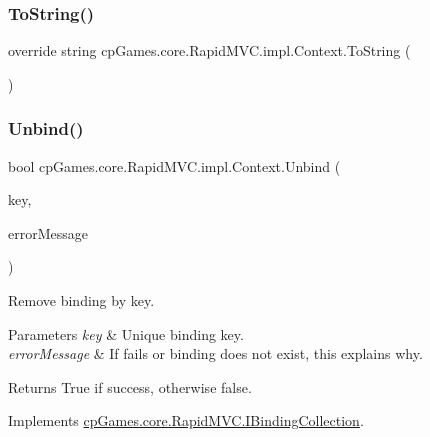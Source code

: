 \subsubsection{\texorpdfstring{ToString()}{ToString()}}
{\footnotesize\ttfamily override string cp\+Games.\+core.\+Rapid\+M\+V\+C.\+impl.\+Context.\+To\+String (\begin{DoxyParamCaption}{ }\end{DoxyParamCaption})}

\mbox{\label{classcp_games_1_1core_1_1_rapid_m_v_c_1_1impl_1_1_context_a7cf9cfaa3957b4e48fdaccd726cbd8aa}} 
\subsubsection{\texorpdfstring{Unbind()}{Unbind()}}
{\footnotesize\ttfamily bool cp\+Games.\+core.\+Rapid\+M\+V\+C.\+impl.\+Context.\+Unbind (\begin{DoxyParamCaption}\item[{\mbox{\hyperlink{interfacecp_games_1_1core_1_1_rapid_m_v_c_1_1_i_binding_key}{I\+Binding\+Key}}}]{key,  }\item[{out string}]{error\+Message }\end{DoxyParamCaption})}



Remove binding by key. 


\begin{DoxyParams}{Parameters}
{\em key} & Unique binding key.\\
\hline
{\em error\+Message} & If fails or binding does not exist, this explains why.\\
\hline
\end{DoxyParams}
\begin{DoxyReturn}{Returns}
True if success, otherwise false.
\end{DoxyReturn}


Implements \mbox{\hyperlink{interfacecp_games_1_1core_1_1_rapid_m_v_c_1_1_i_binding_collection_ab20c12c64a91e24e7685780dd64f1d87}{cp\+Games.\+core.\+Rapid\+M\+V\+C.\+I\+Binding\+Collection}}.

\mbox{\label{classcp_games_1_1core_1_1_rapid_m_v_c_1_1impl_1_1_context_aa1b62f966c4cf9b70e12e4db3bd80903}} 
